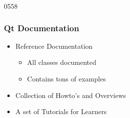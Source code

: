 \begin{slide}{0558} \frametitle{Qt Documentation} 
  \begin{itemize}
    \item Reference Documentation
    \begin{itemize}
      \item All classes documented
      \item Contains tons of examples
    \end{itemize}
    \item Collection of Howto's and Overviews
    \item A set of Tutorials for Learners
  \end{itemize}
  \vspace{3mm}
\end{slide}

